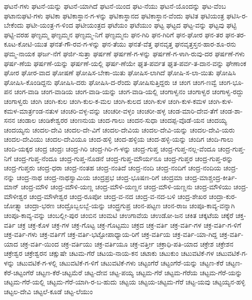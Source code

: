 ಘಟನೆ-ಗಳು
ಘಟನೆ-ಯನ್ನು
ಘಟನೆ-ಯಾಗಿದೆ
ಘಟನೆ-ಯಿಂದ
ಘಟ-ನೆಯು
ಘಟನೆ-ಯೊಂದನ್ನು
ಘಟ-ವೆಂಬ
ಘಟಾನುಘಟಿ-ಗಳು
ಘಟಿಕಾ
ಘಟಿಕಾಸ್ಥಾನ-ಗ-ಳನ್ನು
ಘಟಿಕಾಸ್ಥಾನದ
ಘಟಿಕಾಸ್ಥಾನ-ವೆಂದು
ಘಟಿತ
ಘಟಿಯಂತ್ರ
ಘಟಿಸಿ-ರ-ಬೇಕೆಂದು
ಘಟೀ-ಯಂತ್ರ-ಗ-ಳಿಂದ
ಘಟೀಯಂತ್ರದ
ಘಟೆಯಂ
ಘಟೆಯುಂ
ಘಟ್ಟ
ಘಟ್ಟದ
ಘಟ್ಟ-ವನ್ನು
ಘಟ್ಟವು
ಘಟ್ಟಿ
ಘಟ್ಟಿ-ವರಹ
ಘಣ್ಟಮ್ಮ
ಘಣ್ಟಮ್ಮನ
ಘಣ್ಟಮ್ಮ-ನಿಗೆ
ಘಣ್ಟಮ್ಮನು
ಘನ-ಗಿರಿ
ಘನ-ಗಿರಿಗೆ
ಘನ-ಘೋರ
ಘನ-ತರ
ಘನ-ತರ-ಕೂಟ-ಕೋಟಿ-ಯುತ
ಘನತೆ-ಗೌ-ರವ-ಗ-ಳನ್ನು
ಘನ-ತೆಯು
ಘನತೆ-ವೆತ್ತ
ಘನವೃತ್ತ
ಘನವೃತ್ತಸ್ತನ-ಹಾರ-ಶೂ-ರನು
ಘಮ್ಮ-ನಾಯಕ
ಘರ್ಜ-ನೆಗೆ
ಘರ್ಜಿ-ಸುತ್ತಾ
ಘರ್ಷಣೆ
ಘರ್ಷಣೆ-ಗ-ಳನ್ನು
ಘರ್ಷಣೆ-ಗ-ಳಾಗಿ-ರುವು-ದರ
ಘರ್ಷಣೆ-ಗಳು
ಘರ್ಷ-ಣೆಯ
ಘರ್ಷಣೆ-ಯನ್ನು
ಘರ್ಷಣೆ-ಯಲ್ಲಿ
ಘರ್ಷ-ಣೆಯೇ
ಘೃತ-ಪರ್ವತ
ಘೃತ-ಪರ್ವ-ತ-ದಾನ-ವನ್ನು
ಘೇಣಾಂಕ
ಘೋರ
ಘೋರ-ವಾದ
ಘೋಷಣೆ
ಘೋಷಿಸ-ಬೇಕಾ-ಯಿತು
ಘೋಷಿಸ-ಲಾಗಿದೆ
ಘೋಷಿ-ಸ-ಲಾ-ಯಿತು
ಘೋಷಿಸಿ
ಘೋಷಿಸಿ-ಕೊಂಡಿದ್ದನು
ಘೋಷಿಸಿ-ದರು
ಘೋಷಿಸಿ-ದ-ರೆಂದು
ಘೋಷಿಸುತ್ತಿದ್ದರು
ಚ
ಚಂಗ
ಚಂಗ-ಣವ್ವೆ
ಚಂಗ-ಭೂ-ಪನ
ಚಂಗ-ವಾಡಿ
ಚಂಗ-ವಾಡಿಯ
ಚಂಗ-ವಾಡಿ-ಯನ್ನು
ಚಂಗ-ವಾಡಿ-ಯಲ್ಲಿ
ಚಂಗಾಳ್ವನಂ
ಚಂಗಾಳ್ವರ
ಚಂಗಾಳ್ವ-ರದ್ದು
ಚಂಗಾಳ್ವರು
ಚಂಗಿ
ಚಂಗಿ-ಕುಲ
ಚಂಗಿ-ಕುಲ-ಕ-ಮಲ
ಚಂಗಿ-ಕುಲದ
ಚಂಗಿ-ಕುಳ
ಚಂಗಿ-ಕುಳ-ಕಮಳ
ಚಂಗಿ-ಕುಳ-ಕಮಳ-ಮಾರ್ತ್ರಂಡ-ನತುಳ
ಚಂಚರಿ-ವಳ್ಳ-ವನ್ನು
ಚಂಚರೀ-ವಳ್ಳಂ
ಚಂಚರೀ-ಹಳ್ಳ
ಚಂಡ-ಮಾರಿ-ದೇವ-ತೆಗೆ
ಚಂಡ-ಶಾ-ಸನನ
ಚಂಡಾಲ
ಚಂಡಿಕೇಶ್ವರರ
ಚಂಣನುಯ
ಚಂದ-ಗಾಲು
ಚಂದನ-ಸುಧಾ
ಚಂದಪ್ಪ-ವೊಡೆ-ಯನ
ಚಂದಯ್ಯ
ಚಂದಯ್ಯನು
ಚಂದಲ-ದೇವಿ
ಚಂದಲ-ದೇ-ವಿಗೆ
ಚಂದಲ-ದೇವಿಯ
ಚಂದಲ-ದೇವಿ-ಯನ್ನು
ಚಂದಲ-ದೇವಿ-ಯರು
ಚಂದಲ-ದೇವಿಯು
ಚಂದಲ-ದೇವಿಯೂ
ಚಂದ-ಹಳ್ಳಿ
ಚಂದ-ಹಳ್ಳಿಯ
ಚಂದ-ಹಳ್ಳಿ-ಯನ್ನು
ಚಂದಿಗ
ಚಂದಿ-ಗಾಲು
ಚಂದಿ-ಯಕ್ಕರ
ಚಂದ್ರ
ಚಂದ್ರಃ
ಚಂದ್ರ-ಗಿರಿ
ಚಂದ್ರ-ಗಿರಿ-ಗ-ಳನ್ನು
ಚಂದ್ರ-ಗುಪ್ತ
ಚಂದ್ರ-ಗುಪ್ತ-ನಲ್ಲ-ವೆಂದೂ
ಚಂದ್ರ-ಗುಪ್ತ-ನಿಗೆ
ಚಂದ್ರ-ಗುಪ್ತ-ನೆಂದೂ
ಚಂದ್ರ-ಗುಪ್ತ-ನೊಡನೆ
ಚಂದ್ರ-ಗುಪ್ತ-ಮೌರ್ಯನೂ
ಚಂದ್ರ-ಗುಪ್ತರ
ಚಂದ್ರ-ಗುಪ್ತ-ರನ್ನು
ಚಂದ್ರ-ಗುಪ್ತರು
ಚಂದ್ರ-ಧರಾ
ಚಂದ್ರ-ನಂತಹ
ಚಂದ್ರ-ನಂತಿದೆ
ಚಂದ್ರ-ನಂದಿ
ಚಂದ್ರ-ನಂದಿಗೆ
ಚಂದ್ರ-ನಂದಿಯ
ಚಂದ್ರ-ನನ್ನು
ಚಂದ್ರ-ನಾಥ
ಚಂದ್ರ-ನಾಥಸ್ವಾಮಿಯ
ಚಂದ್ರಪ್ರಭ
ಚಂದ್ರ-ಭೂಷಣ-ರಿಗೆ
ಚಂದ್ರಮಾ
ಚಂದ್ರ-ಮಾಶ್ಚಂದ್ರ-ಕೀರ್ತಿ-ಮಾನ್
ಚಂದ್ರ-ಮೌಳಿ
ಚಂದ್ರ-ಮೌಳಿ-ಯಣ್ಣ
ಚಂದ್ರ-ಮೌಳಿ-ಯಣ್ಣನ
ಚಂದ್ರ-ಮೌಳಿ-ಯಣ್ಣನು
ಚಂದ್ರ-ಮೌಳಿಯು
ಚಂದ್ರ-ಮೌಳೀಶ್ವರ
ಚಂದ್ರ-ಮೌಳೇಶ್ವರ
ಚಂದ್ರ-ರೂಪೋ
ಚಂದ್ರ-ವ-ನದ
ಚಂದ್ರ-ವ-ನದ-ಬಳಿ
ಚಂದ್ರ-ಶೇಖರ
ಚಂದ್ರಾ-ಕುರ-ಜೋತ್ಸ್ನಾ
ಚಂದ್ರಾ-ಭರಣ
ಚಂದ್ರೊಬ್ಬಲಬ್ಬೆ-ಯನ್ನು
ಚಂದ್ರ್ರಗುಪ್ರ
ಚಂನ-ಪಟ್ಟಣ
ಚಂನ-ರಾಜ
ಚಂಪೂ-ಕಾವ್ಯ-ವನ್ನಾಗಿ
ಚಂಪೂ-ಕಾವ್ಯ-ವನ್ನು
ಚಂಬಲ್ಲೀ-ಪುರ
ಚಂಬಿನ
ಚಂಮಟಿ
ಚಉಗಾವೆಯ
ಚಉಡೋ-ಜನ
ಚಕಿತ
ಚಕ್ಕಟೆಯ
ಚಕ್ಕೆರೆ
ಚಕ್ತ-ವರ್ತಿ
ಚಕ್ರ
ಚಕ್ರ-ಕೊಳ
ಚಕ್ರ-ಗಳ
ಚಕ್ರ-ಗೊಟ್ಟ
ಚಕ್ರ-ಗೊಟ್ಟಮು
ಚಕ್ರದ
ಚಕ್ರ-ವರ್ತಿ
ಚಕ್ರ-ವರ್ತಿ-ಗಳ
ಚಕ್ರ-ವರ್ತಿ-ಗ-ಳಿಗೆ
ಚಕ್ರ-ವರ್ತಿ-ಗಳು
ಚಕ್ರ-ವರ್ತಿಗೆ
ಚಕ್ರ-ವರ್ತಿ-ಭಟ್ಟೋಪಾಧ್ಯಾಯ-ರಿಗೆ
ಚಕ್ರ-ವರ್ತಿಯ
ಚಕ್ರ-ವರ್ತಿ-ಯಾ-ಗಿದ್ದ
ಚಕ್ರ-ವರ್ತಿ-ಯಾದ
ಚಕ್ರ-ವರ್ತಿ-ಯಿಂದ
ಚಕ್ರ-ವರ್ತಿಯು
ಚಕ್ರ-ವರ್ತಿಯೂ
ಚಕ್ರ-ವರ್ತ್ತೀ
ಚಕ್ರಾಧಿ-ಪತಿ-ಯಾದ
ಚಕ್ರೇಶ
ಚಕ್ರೇಶನ
ಚಕ್ರೇಶ್ವರ
ಚಕ್ರೇಶ್ವರನ
ಚಕ್ಷುಷೇ
ಚಟಮ-ಗೆರೆ
ಚಟಯ-ನಾಯ-ಕನ
ಚಟಾಕು
ಚಟುಕುಂ
ಚಟುವಟಿಕೆ-ಗಳ
ಚಟುವಟಿಕೆ-ಗ-ಳನ್ನು
ಚಟುವಟಿಕೆ-ಗ-ಳಲ್ಲಿ
ಚಟುವಟಿಕೆ-ಗ-ಳಿಗೆ
ಚಟುವಟಿಕೆ-ಗಳು
ಚಟ್ಟಂಗೆರೆ
ಚಟ್ಟಂಗೆರೆ-ಯನ್ನು
ಚಟ್ಟಣ-ಕೆರೆ
ಚಟ್ಟಣ-ಕೆರೆ-ಚಟ್ಟಂಗೆರೆ
ಚಟ್ಟಣ-ಕೆರೆ-ಚಟ್ಟಮೆರೆ
ಚಟ್ಟ-ದೇವ
ಚಟ್ಟ-ಪಯ್ಯ
ಚಟ್ಟಮ-ಗೆರೆ
ಚಟ್ಟಮ-ಗೆರೆಯ
ಚಟ್ಟಮ-ಗೆರೆ-ಯನ್ನು
ಚಟ್ಟಮ-ಗೆರೆ-ಯಲ್ಲಿ
ಚಟ್ಟಮ-ಗೆರೆ-ಯಾಗಿ-ರ-ಬ-ಹುದು
ಚಟ್ಟಯ
ಚಟ್ಟಯ-ಚಟ್ಟಮ-ಗೆರೆ
ಚಟ್ಟ-ಯವು
ಚಟ್ಟಯ್ಯನ-ಹಳ್ಳಿ
ಚಟ್ಟಲ-ದೇವಿ
ಚಟ್ಟಲೆ-ಕೂಡೆ
ಚಟ್ಟ-ಲೆಯುಂ
